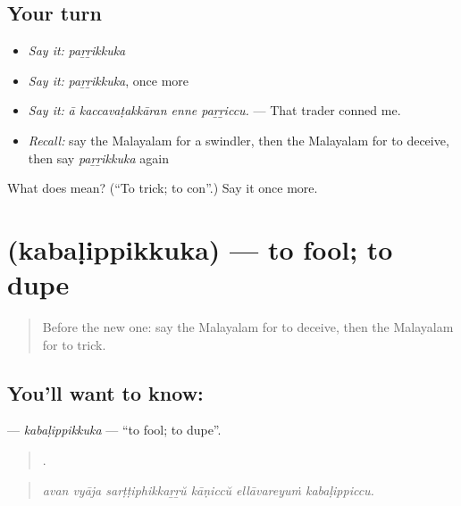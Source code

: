 \subsection*{Your turn}
\begin{itemize}
\raggedright
  \item \emph{Say it:} \emph{paṟṟikkuka}
  \item \emph{Say it:} \emph{paṟṟikkuka}, once more
  \item \emph{Say it:} \emph{ā kaccavaṭakkāran enne paṟṟiccu.} — That trader conned me.
  \item \emph{Recall:} say the Malayalam for a swindler, then the Malayalam for to deceive, then say \emph{paṟṟikkuka} again
\end{itemize}

\begin{tcolorbox}[breakable,colback=teal!4,colframe=teal!35!black,title={Before you move on}]
What does  mean? (\textquotedblleft{}To trick; to con\textquotedblright{}.) Say it once more.
\end{tcolorbox}
\section[\texorpdfstring{\ml{കബളിപ്പിക്കുക} (kabaḷippikkuka)}{കബളിപ്പിക്കുക (kabaḷippikkuka)}]{ (kabaḷippikkuka) — to fool; to dupe}

\label{lesson:ML-C372-kabalippikkuka}



\begin{quote}
Before the new one: say the Malayalam for to deceive, then the Malayalam for to trick.
\end{quote}

\subsection*{You'll want to know: }
\textbf{} — \emph{kabaḷippikkuka} — \textquotedblleft{}to fool; to dupe\textquotedblright{}.

\begin{quote}
     .
\end{quote}

\begin{quote}
\emph{avan vyāja sarṭṭiphikkaṟṟŭ kāṇiccŭ ellāvareyuṁ kabaḷippiccu.}
\end{quote}

